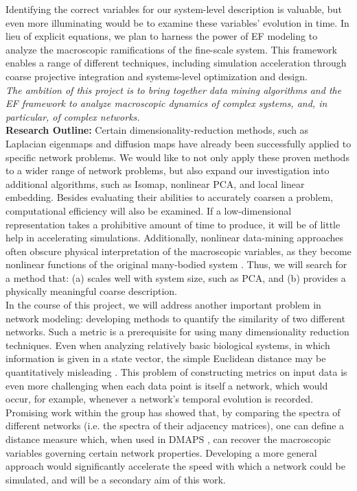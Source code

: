 \documentclass[11pt]{article}
\begin{document}
\indent Identifying the correct variables for our system-level description is valuable, but even more illuminating would be to examine these variables' evolution in time. In lieu of explicit equations, we plan to harness the power of EF modeling to analyze the macroscopic ramifications of the fine-scale system. This framework enables a range of different techniques, including simulation acceleration through coarse projective integration and systems-level optimization and design.\\
\indent \textit{The ambition of this project is to bring together data mining algorithms and the EF framework to analyze macroscopic dynamics of complex systems, and, in particular, of complex networks.}\\
\textbf{Research Outline:}  Certain dimensionality-reduction methods, such as Laplacian eigenmaps and diffusion maps have already been successfully applied to specific network problems. We would like to not only apply these proven methods to a wider range of network problems, but also expand our investigation into additional algorithms, such as Isomap, nonlinear PCA, and local linear embedding. Besides evaluating their abilities to accurately coarsen a problem, computational efficiency will also be examined. If a low-dimensional representation takes a prohibitive amount of time to produce, it will be of little help in accelerating simulations. Additionally, nonlinear data-mining approaches often obscure physical interpretation of the macroscopic variables, as they become nonlinear functions of the original many-bodied system \cite{Ferguson2011}. Thus, we will search for a method that: (a) scales well with system size, such as PCA, and (b) provides a physically meaningful coarse description. \\
\indent In the course of this project, we will address another important problem in network modeling: developing methods to quantify the similarity of two different networks. Such a metric is a prerequisite for using many dimensionality reduction techniques. Even when analyzing relatively basic biological systems, in which information is given in a state vector, the simple Euclidean distance may be quantitatively misleading \cite{Bold2007}. This problem of constructing metrics on input data is even more challenging when each data point is itself a network, which would occur, for example, whenever a network's temporal evolution is recorded. Promising work within the group has showed that, by comparing the spectra of different networks (i.e. the spectra of their adjacency matrices), one can define a distance measure which, when used in DMAPS \cite{Coifman2006}, can recover the macroscopic variables governing certain network properties. Developing a more general approach would significantly accelerate the speed with which a network could be simulated, and will be a secondary aim of this work.\\
\end{document}
